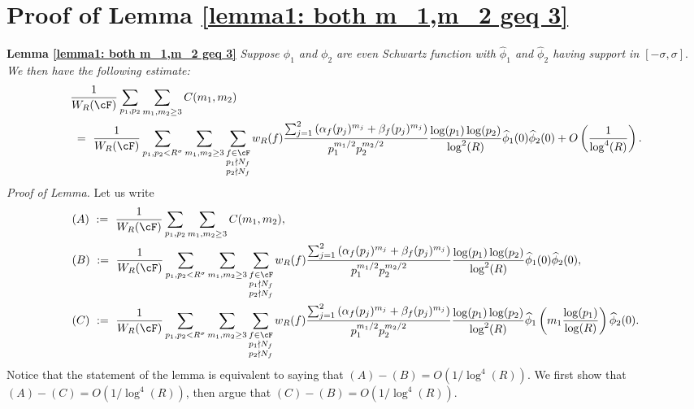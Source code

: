 \documentclass[11pt, reqno]{amsart}
\theoremstyle{definition}
\theoremstyle{remark}
\numberwithin{equation}{section}
\renewcommand{\hat}{\widehat}
\begin{document}
\section{Proof of Lemma \ref{lemma1: both m_1,m_2 geq 3}} \label{appendix: Proof of Lemma both m1,m2 geq 3}
\noindent \textbf{Lemma \ref{lemma1: both m_1,m_2 geq 3}} \textit{Suppose $\phi_1$ and $\phi_2$ are even Schwartz function with $\hat\phi_1$ and $\hat\phi_2$ having support in $[-\sigma,\sigma].$
We then have the following estimate: }
\small{\begin{align}\label{lem:phi0.estimate.statement2}
    &\frac{1}{W_R(\cF)}\sum_{\substack{p_1,p_2}}\sum_{m_1,m_2\geq 3} C(m_1,m_2)\notag \\
    & \ = \ \frac{1}{W_R(\cF)}\sum_{p_1,p_2<R^\sigma}\sum_{m_1,m_2\geq 3}\sum_{\substack{f\in \cF\\p_1\nmid N_f\\p_2\nmid N_f }}w_R(f)\frac{\sum_{j=1}^2\left(\alpha_f(p_j)^{m_j}+\beta_f(p_j)^{m_j}\right)}{p_1^{m_1/2}p_2^{m_2/2}} \frac{\log(p_1)\log (p_2)}{\log^2(R)}\hat\phi_1(0) \hat \phi_2(0)  + O\left(\frac{1}{\log^4(R)}\right).
\end{align}}
\textit{Proof of Lemma.}
Let us write
\small
\begin{align*}
    &(A) \ :=\  \frac{1}{W_R(\cF)}\sum_{p_1,p_2}\sum_{m_1,m_2\geq 3} C(m_1,m_2),\\
   & (B)\ :=\ \frac{1}{W_R(\cF)}\sum_{p_1,p_2<R^\sigma}\sum_{m_1,m_2 \geq 3}\sum_{\substack{f\in \cF\\p_1\nmid N_f\\p_2\nmid N_f }}w_R(f)\frac{\sum_{j=1}^2\left(\alpha_f(p_j)^{m_j}+\beta_f(p_j)^{m_j}\right)}{p_1^{m_1/2}p_2^{m_2/2}} \frac{\log(p_1)\log (p_2)}{\log^2(R)}\hat\phi_1(0) \hat \phi_2(0), \\
   &(C)\  := \ \frac{1}{W_R(\cF)}\sum_{p_1,p_2<R^\sigma}\sum_{m_1,m_2 \geq 3 }\sum_{\substack{f\in \cF\\p_1\nmid N_f\\p_2\nmid N_f }}w_R(f)\frac{\sum_{j=1}^2\left(\alpha_f(p_j)^{m_j}+\beta_f(p_j)^{m_j}\right)}{p_1^{m_1/2}p_2^{m_2/2}}
       \frac{\log(p_1)\log (p_2)}{\log^2(R)} \hat\phi_1 \left(m_1 \frac{\log(p_1)}{\log(R)}\right) \hat\phi_2(0).
\end{align*}
\normalsize
Notice that the statement of the lemma is equivalent to saying that $(A)-(B) = O\left(1/\log^4(R)\right)$.
We first show that $(A)- (C) =O\left(1/\log^4(R)\right)$, then argue that $(C) - (B) = O\left(1/\log^4(R)\right).$
\end{document}
